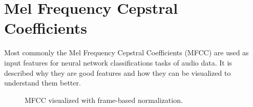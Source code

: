 
\section{Mel Frequency Cepstral Coefficients}\label{sec:signal_mfcc}
Most commonly the Mel Frequency Cepstral Coefficients (MFCC) are used as input features for neural network classifications tasks of audio data.
It is described why they are good features and how they can be visualized to understand them better.

\begin{figure}[!ht]
  \centering
  \caption{MFCC visualized with frame-based normalization.}
  \label{fig:signal_mfcc_examples}
\end{figure}
\FloatBarrier
\noindent

